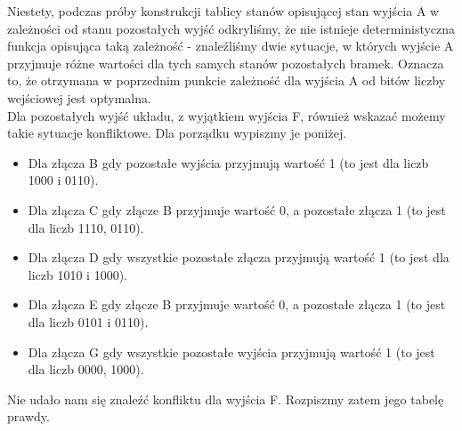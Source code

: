 \documentclass{article}
\begin{document}
            Niestety, podczas próby konstrukcji tablicy stanów opisującej stan wyjścia A w zależności od stanu pozostałych wyjść odkryliśmy, że nie istnieje deterministyczna funkcja opisująca taką zależność - znaleźliśmy dwie sytuacje, w których wyjście A przyjmuje różne wartości dla tych samych stanów pozostałych bramek. Oznacza to, że otrzymana w poprzednim punkcie zależność dla wyjścia A od bitów liczby wejściowej jest optymalna. \\
            Dla pozostałych wyjść układu, z wyjątkiem wyjścia F, również wskazać możemy takie sytuacje konfliktowe. Dla porządku wypiszmy je poniżej. 
            \begin{itemize}
                \item Dla złącza B gdy pozostałe wyjścia przyjmują wartość 1 (to jest dla liczb 1000 i 0110).
                \item Dla złącza C gdy złącze B przyjmuje wartość 0, a pozostałe złącza 1 (to jest dla liczb 1110, 0110).
                \item Dla złącza D gdy wszystkie pozostałe złącza przyjmują wartość 1 (to jest dla liczb 1010 i 1000).
                \item Dla złącza E gdy złącze B przyjmuje wartość 0, a pozostałe złącza 1 (to jest dla liczb 0101 i 0110).
                \item Dla złącza G gdy wszystkie pozostałe wyjścia przyjmują wartość 1 (to jest dla liczb 0000, 1000).
            \end{itemize}
            \newpage
            Nie udało nam się znaleźć konfliktu dla wyjścia F. Rozpiszmy zatem jego tabelę prawdy. 
\end{document}
